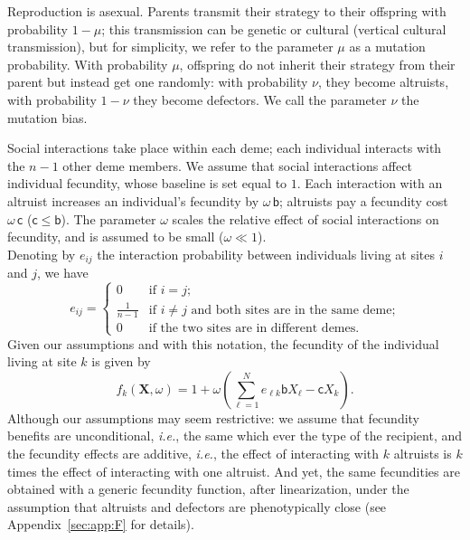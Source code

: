 \documentclass[11pt, letterpaper]{article}
\newcommand{\ie}{\textit{i.e.}}
\newcommand{\appname}[0]{Appendix}
\newcommand{\bb}{\mathsf{b}}
\newcommand{\cc}{\mathsf{c}}
\newcommand{\mutbias}{\nu}
\begin{document}
Reproduction is asexual. Parents transmit their strategy to their offspring with probability $1-\mu$; this transmission can be genetic or cultural (vertical cultural transmission), but for simplicity, we refer to the parameter $\mu$ as a mutation probability. With probability $\mu$, offspring do not inherit their strategy from their parent but instead get one randomly: with probability $\mutbias$, they become altruists, with probability $1-\mutbias$ they become defectors. We call the parameter $\mutbias$ the mutation bias. 

Social interactions take place within each deme; each individual interacts with the $n-1$ other deme members. We assume that social interactions affect individual fecundity, whose baseline is set equal to $1$. Each interaction with an altruist increases an individual's fecundity by $\omega \, \bb$; altruists pay a fecundity cost $\omega \, \cc$ ($\cc \leq \bb$). The parameter $\omega$ scales the relative effect of social interactions on fecundity, and is assumed to be small ($\omega \ll 1$). \\
Denoting by $e_{ij}$ the interaction probability between individuals living at sites $i$ and $j$, we have
%
\begin{equation}\label{eq:defE}
e_{ij} = \begin{cases}
 0 & \textrm{if $i=j$;}\\
 \frac{1}{n-1} & \textrm{if $i\neq j$ and both sites are in the same deme;}\\
 0 & \textrm{if the two sites are in different demes.} 
\end{cases}
\end{equation}
Given our assumptions and with this notation, the fecundity of the individual living at site $k$ is given by 
\begin{equation}\label{eq:deff}
f_k(\mathbf{X}, \omega) = 1 + \omega \left( \sum_{\ell =1}^N e_{\ell k} \bb X_{\ell} - \cc X_k \right).
\end{equation}
Although our assumptions may seem restrictive: we assume that fecundity benefits are unconditional, \ie, the same which ever the type of the recipient, and the fecundity effects are additive, \ie, the effect of interacting with $k$ altruists is $k$ times the effect of interacting with one altruist. And yet, the same fecundities are obtained with a generic fecundity function, after linearization, under the assumption that altruists and defectors are phenotypically close (see \appname~\ref{sec:app:F} for details).
\end{document}
